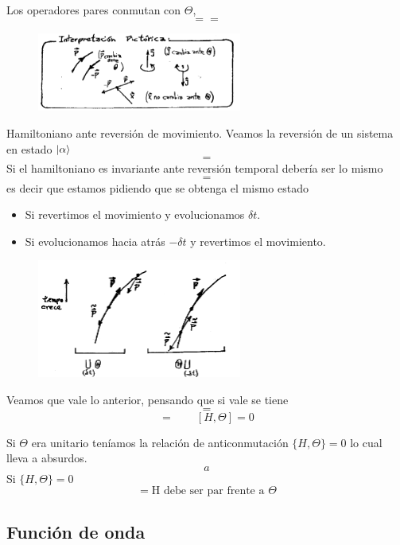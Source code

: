 \documentclass[10pt,oneside]{CBFT_book}
\begin{document}
Los operadores pares conmutan con $\Theta$,
\[
	= =
\]
\begin{figure}[htb]
	\begin{center}
	\includegraphics[width=0.6\textwidth]{images/teo2_18.pdf}
	\end{center}
	\caption{}
\end{figure} 
Hamiltoniano ante reversión de movimiento. Veamos la reversión de un sistema en estado $\Ket{\alpha}$
\[
	=
\]
Si el hamiltoniano es invariante ante reversión temporal debería ser lo mismo 
\[
	=
\]
es decir que estamos pidiendo que se obtenga el mismo estado 
\begin{itemize}
 \item Si revertimos el movimiento y evolucionamos $\delta t$.
 \item Si evolucionamos hacia atrás $-\delta t$ y revertimos el movimiento.
\end{itemize}
\begin{figure}[htb]
	\begin{center}
	\includegraphics[width=0.6\textwidth]{images/teo2_19.pdf}
	\end{center}
	\caption{}
\end{figure} 
Veamos que vale lo anterior, pensando que si vale se tiene 
\[
	=
\]
\[
	=  \qquad [H,\Theta]=0
\]

Si $\Theta$ era unitario teníamos la relación de anticonmutación $\{ H, \Theta \}=0$ lo cual lleva a absurdos.
\[
	a
\]
Si $\{ H,\Theta \} = 0$
\[
	= \text{H debe ser par frente a $\Theta$}
\]

\subsection{Función de onda}
\end{document}
